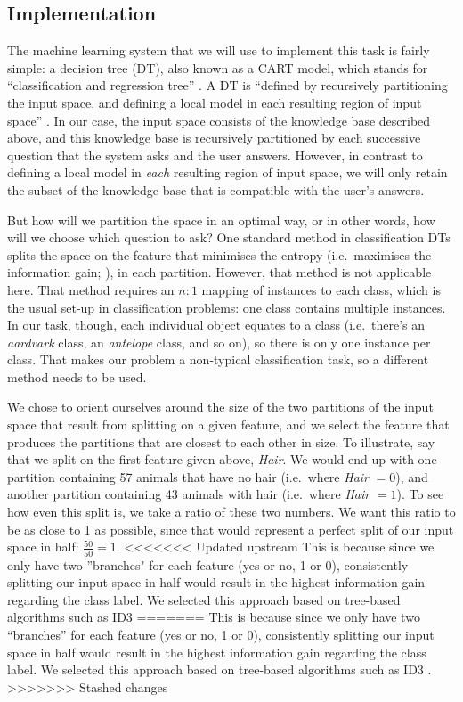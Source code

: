 \documentclass[a4paper,12pt]{article}
\begin{document}
\subsection*{Implementation}

The machine learning system that we will use to implement this task is fairly simple: a decision tree (DT), also known as a CART model, which stands for ``classification and regression tree'' \citep[Section 16.2]{Murphy2012}.
A DT is ``defined by recursively partitioning the input space, and defining a local model in each resulting region of input space'' \citep[545]{Murphy2012}.
In our case, the input space consists of the knowledge base described above, and this knowledge base is recursively partitioned by each successive question that the system asks and the user answers.
However, in contrast to defining a local model in \textit{each} resulting region of input space, we will only retain the subset of the knowledge base that is compatible with the user's answers.

But how will we partition the space in an optimal way, or in other words, how will we choose which question to ask?
One standard method in classification DTs splits the space on the feature that minimises the entropy (i.e.\ maximises the information gain; \citealt{Quinlan1986}), in each partition.
However, that method is not applicable here.
That method requires an $n : 1$ mapping of instances to each class, which is the usual set-up in classification problems: one class contains multiple instances.
In our task, though, each individual object equates to a class (i.e.\ there's an \textit{aardvark} class, an \textit{antelope} class, and so on), so there is only one instance per class.
That makes our problem a non-typical classification task, so a different method needs to be used.

We chose to orient ourselves around the size of the two partitions of the input space that result from splitting on a given feature, and we select the feature that produces the partitions that are closest to each other in size.
To illustrate, say that we split on the first feature given above, \textit{Hair}.
We would end up with one partition containing 57 animals that have no hair (i.e.\ where \textit{Hair} $= 0$), and another partition containing 43 animals with hair (i.e.\ where \textit{Hair} $= 1$).
To see how even this split is, we take a ratio of these two numbers.
We want this ratio to be as close to 1 as possible, since that would represent a perfect split of our input space in half: $\frac{50}{50} = 1$.
<<<<<<< Updated upstream
This is because since we only have two ''branches" for each feature (yes or no, 1 or 0), consistently splitting our input space in half would result in the highest information gain regarding the class label. We selected this approach based on tree-based algorithms such as ID3 \citep{Quinlan1986} \cite{Bishop}
=======
This is because since we only have two ``branches'' for each feature (yes or no, 1 or 0), consistently splitting our input space in half would result in the highest information gain regarding the class label. 
We selected this approach based on tree-based algorithms such as ID3 \citep{Quinlan1986, Bishop2006}.
>>>>>>> Stashed changes
\end{document}
